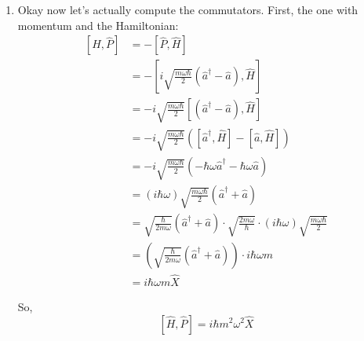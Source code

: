 \documentclass[twoside]{article}
\begin{document}
\begin{enumerate}
   \begin{enumerate}
      \item Okay now let's actually compute the commutators. First, the one with momentum and the Hamiltonian:
      \begin{align*}
         \left[ \hat{H}, \hat{P} \right] &= -\left[\hat{P}, \hat{H} \right] \\
         &= -\left[i \sqrt{\frac{m\omega\hbar}{2}} \left( \hat{a}^{\dagger} - \hat{a} \right), \hat{H} \right] \\
         &= -i \sqrt{\frac{m\omega\hbar}{2}} \left[\left( \hat{a}^{\dagger} - \hat{a} \right), \hat{H} \right] \\
         &= -i \sqrt{\frac{m\omega\hbar}{2}} ( \left[ \hat{a}^{\dagger}, \hat{H} \right] - \left[ \hat{a}, \hat{H} \right] ) \\
         &= -i\sqrt{\frac{m\omega\hbar}{2}} \left( -\hbar\omega \hat{a}^{\dagger} - \hbar\omega \hat{a} \right) \\
         &= (i\hbar\omega) \sqrt{\frac{m\omega\hbar}{2}} \left(\hat{a}^{\dagger} + \hat{a} \right) \\
         &= \sqrt{\frac{\hbar}{2m\omega}} \left(\hat{a}^{\dagger} + \hat{a} \right) \cdot \sqrt{\frac{2m\omega}{\hbar}} \cdot (i\hbar\omega)\sqrt{\frac{m\omega\hbar}{2}} \\
         &= \left( \sqrt{\frac{\hbar}{2m\omega}} \left(\hat{a}^{\dagger} + \hat{a} \right) \right) \cdot i\hbar\omega m\\
         &= i\hbar \omega m \hat{X}
      \end{align*}

      So, 
      \[ \boxed{\left[ \hat{H}, \hat{P} \right] = i\hbar m^2 \omega^2 \hat{X}  } \]
      \vskip 1cm


\end{enumerate}
\end{enumerate}
\end{document}
